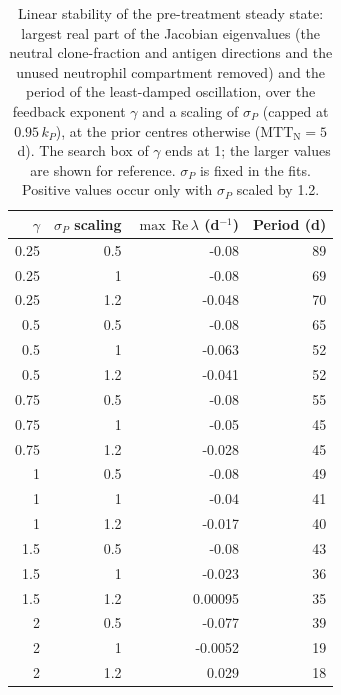 \begin{table}[!htbp]
\centering
\small
\setlength{\tabcolsep}{3.5pt}
\caption{Linear stability of the pre-treatment steady state: largest real part of the Jacobian eigenvalues (the neutral clone-fraction and antigen directions and the unused neutrophil compartment removed) and the period of the least-damped oscillation, over the feedback exponent $\gamma$ and a scaling of $\sigma_P$ (capped at $0.95\,k_P$), at the prior centres otherwise ($\mathrm{MTT}_{\mathrm{N}}=5$~d). The search box of $\gamma$ ends at 1; the larger values are shown for reference. $\sigma_P$ is fixed in the fits. Positive values occur only with $\sigma_P$ scaled by 1.2.}
\label{tab:stability}
\begin{tabular}{rrrr}
\toprule
$\gamma$ & $\sigma_P$ scaling & $\max\,\mathrm{Re}\,\lambda$ (d$^{-1}$) & Period (d) \\
\midrule
0.25 & 0.5 & -0.08 & 89 \\
0.25 & 1 & -0.08 & 69 \\
0.25 & 1.2 & -0.048 & 70 \\
0.5 & 0.5 & -0.08 & 65 \\
0.5 & 1 & -0.063 & 52 \\
0.5 & 1.2 & -0.041 & 52 \\
0.75 & 0.5 & -0.08 & 55 \\
0.75 & 1 & -0.05 & 45 \\
0.75 & 1.2 & -0.028 & 45 \\
1 & 0.5 & -0.08 & 49 \\
1 & 1 & -0.04 & 41 \\
1 & 1.2 & -0.017 & 40 \\
1.5 & 0.5 & -0.08 & 43 \\
1.5 & 1 & -0.023 & 36 \\
1.5 & 1.2 & 0.00095 & 35 \\
2 & 0.5 & -0.077 & 39 \\
2 & 1 & -0.0052 & 19 \\
2 & 1.2 & 0.029 & 18 \\
\bottomrule
\end{tabular}
\end{table}
